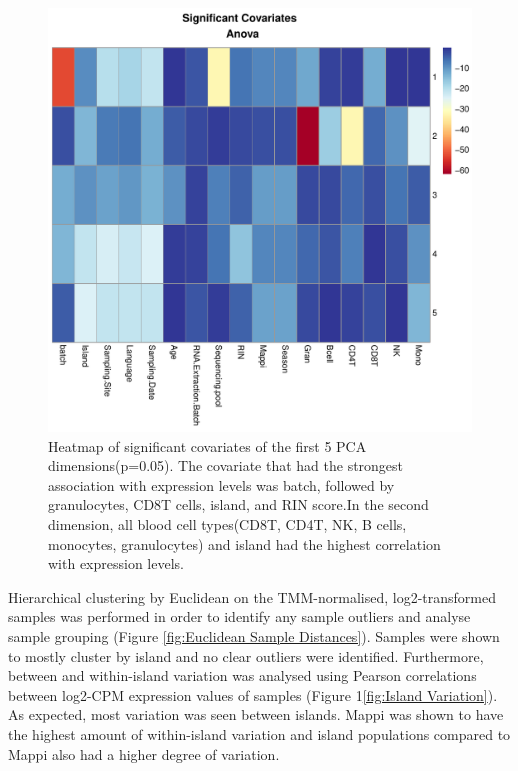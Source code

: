 \documentclass[12pt,a4paper,titlepage,twoside,openright]{book}
\begin{document}
\begin{mainmatter}
\begin{figure}[htb!]
\centering
\includegraphics[width=\textwidth,height=\textheight,keepaspectratio]{significantCovariates_AnovaHeatmap.pdf}
\caption{Heatmap of significant covariates of the first 5 PCA dimensions(p=0.05). The covariate that had the strongest association with expression levels was batch, followed by granulocytes, CD8T cells, island, and RIN score.In the second dimension, all blood cell types(CD8T, CD4T, NK, B cells, monocytes, granulocytes) and island had the highest correlation with expression levels.}
\label{fig:Significant Covariates}
\end{figure}

Hierarchical clustering by Euclidean on the TMM-normalised, log2-transformed samples was performed in order to identify any sample outliers and analyse sample grouping (﻿Figure \ref{fig:Euclidean Sample Distances}﻿). Samples were shown to mostly cluster by island and no clear outliers were identified. Furthermore, between and within-island variation was analysed using Pearson correlations between log2-CPM expression values of samples (﻿Figure 1\ref{fig:Island Variation}). As expected, most variation was seen between islands. Mappi was shown to have the highest amount of within-island variation and island populations compared to Mappi also had a higher degree of variation. 


\end{mainmatter}
\end{document}
